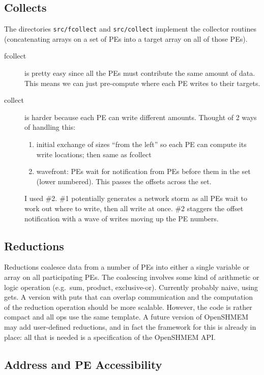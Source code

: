 \documentclass[english]{article}
\newcommand{\openshmem} {\mbox{OpenSHMEM}\xspace}
\begin{document}
\subsection{Collects}

The directories \texttt{src/fcollect} and \texttt{src/collect}
implement the collector routines (concatenating arrays on a set of PEs
into a target array on all of those PEs).

\begin{description}
\item[fcollect] is pretty easy since all the PEs must contribute the
  same amount of data. This means we can just pre-compute where each PE
  writes to their targets.
\item[collect] is harder because each PE can write different
  amounts. Thought of 2 ways of handling this:
  \begin{enumerate}
  \item initial exchange of sizes ``from the left'' so each PE can
    compute its write locations; then same as fcollect
  \item wavefront: PEs wait for notification from PEs before them in the
    set (lower numbered). This passes the offsets across the set.
  \end{enumerate}
  I used \#2. \#1 potentially generates a network storm as all PEs wait
  to work out where to write, then all write at once. \#2 staggers the
  offset notification with a wave of writes moving up the PE numbers.
\end{description}

\subsection{Reductions}

Reductions coalesce data from a number of PEs into either a single
variable or array on all participating PEs. The coalescing involves
some kind of arithmetic or logic operation (e.g.\ sum, product,
exclusive-or).  Currently probably naive, using gets. A version with
puts that can overlap communication and the computation of the
reduction operation should be more scalable. However, the code is
rather compact and all ops use the same template. A future version of
\openshmem may add user-defined reductions, and in fact the framework
for this is already in place: all that is needed is a specification of
the \openshmem API.

\subsection{Address and PE Accessibility}
\end{document}
